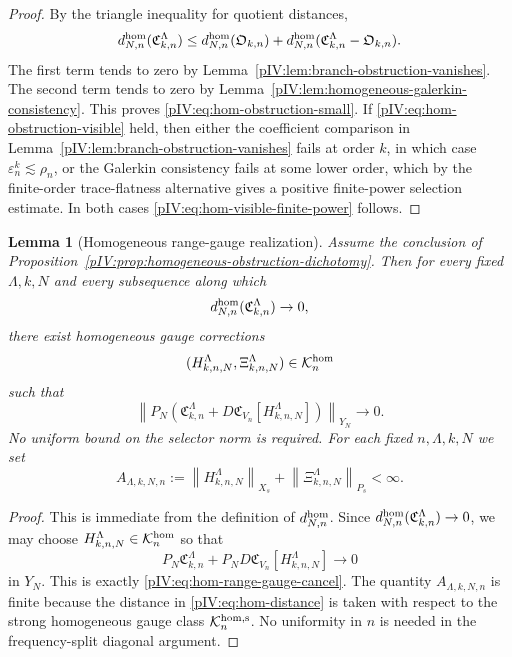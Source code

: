 \documentclass[11pt]{article}
\numberwithin{equation}{section}
\theoremstyle{plain}
\newtheorem{lemma}{Lemma}[section]
\theoremstyle{definition}
\theoremstyle{remark}
\newcommand{\eps}{\varepsilon}
\newcommand{\norm}[2]{\left\|#1\right\|_{#2}}
\newcommand{\calC}{\mathfrak C}
\newcommand{\calK}{\mathcal K}
\newcommand{\Ored}{\mathfrak O}
\begin{document}
\begin{proof}
By the triangle inequality for quotient distances,
\[
        d^{\rm hom}_{N,n}(\calC^\Lambda_{k,n})
        \le
        d^{\rm hom}_{N,n}(\Ored_{k,n})
        +
        d^{\rm hom}_{N,n}(\calC^\Lambda_{k,n}-\Ored_{k,n}).
\]
The first term tends to zero by Lemma~\ref{pIV:lem:branch-obstruction-vanishes}.  The
second term tends to zero by Lemma~\ref{pIV:lem:homogeneous-galerkin-consistency}.  This
proves \eqref{pIV:eq:hom-obstruction-small}.  If \eqref{pIV:eq:hom-obstruction-visible}
held, then either the coefficient comparison in
Lemma~\ref{pIV:lem:branch-obstruction-vanishes} fails at order \(k\), in which case
\(\eps_n^k\lesssim \rho_n\), or the Galerkin consistency fails at some lower order,
which by the finite-order trace-flatness alternative gives a positive finite-power
selection estimate.  In both cases \eqref{pIV:eq:hom-visible-finite-power} follows.
\end{proof}

\begin{lemma}[Homogeneous range-gauge realization]
\label{pIV:lem:homogeneous-range-gauge-realization}
Assume the conclusion of
Proposition~\ref{pIV:prop:homogeneous-obstruction-dichotomy}.  Then for every fixed
\(\Lambda,k,N\) and every subsequence along which
\[
        d^{\rm hom}_{N,n}(\calC^\Lambda_{k,n})\to0,
\]
there exist homogeneous gauge corrections
\[
        (H^\Lambda_{k,n,N},\Xi^\Lambda_{k,n,N})\in\calK^{\rm hom}_n
\]
such that
\begin{equation}\label{pIV:eq:hom-range-gauge-cancel}
        \left\|
        P_N
        \left(
        \calC^\Lambda_{k,n}
        +
        D\calC_{V_n}[H^\Lambda_{k,n,N}]
        \right)
        \right\|_{Y_N}
        \to0 .
\end{equation}
No uniform bound on the selector norm is required.  For each fixed
\(n,\Lambda,k,N\) we set
\begin{equation}\label{pIV:eq:hom-gauge-n-dependent-constant}
        A_{\Lambda,k,N,n}
        :=
        \norm{H^\Lambda_{k,n,N}}{X_s}
        +
        \norm{\Xi^\Lambda_{k,n,N}}{P_s}
        <\infty .
\end{equation}
\end{lemma}

\begin{proof}
This is immediate from the definition of \(d^{\rm hom}_{N,n}\).  Since
\(d^{\rm hom}_{N,n}(\calC^\Lambda_{k,n})\to0\), we may choose
\(H^\Lambda_{k,n,N}\in\calK^{\rm hom}_n\) so that
\[
        P_N\calC^\Lambda_{k,n}
        +
        P_ND\calC_{V_n}[H^\Lambda_{k,n,N}]
        \to0
\]
in \(Y_N\).  This is exactly \eqref{pIV:eq:hom-range-gauge-cancel}.  The quantity
\(A_{\Lambda,k,N,n}\) is finite because the distance in
\eqref{pIV:eq:hom-distance} is taken with respect to the strong homogeneous gauge class
\(\calK^{\rm hom,s}_n\).  No uniformity in \(n\) is needed in the
frequency-split diagonal argument.
\end{proof}
\end{document}
